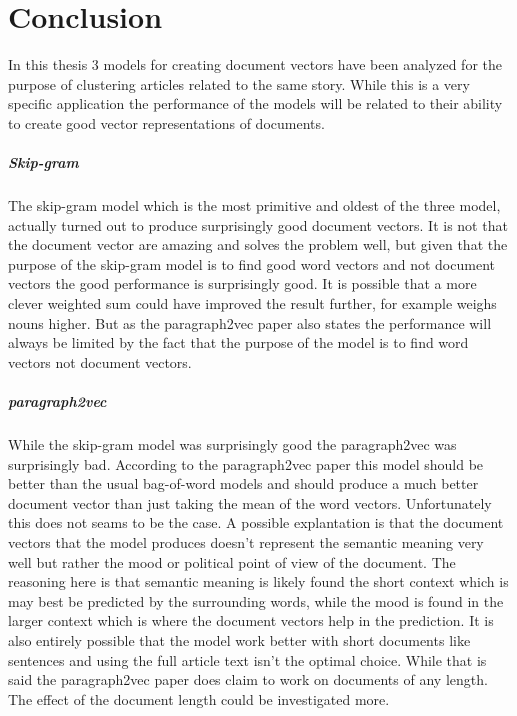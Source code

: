 \chapter{Conclusion}

In this thesis 3 models for creating document vectors have been analyzed for the purpose of clustering articles related to the same story. While this is a very specific application the performance of the models will be related to their ability to create good vector representations of documents.

\paragraph{Skip-gram} The skip-gram model which is the most primitive and oldest of the three model, actually turned out to produce surprisingly good document vectors. It is not that the document vector are amazing and solves the problem well, but given that the purpose of the skip-gram model is to find good word vectors and not document vectors the good performance is surprisingly good. It is possible that a more clever weighted sum could have improved the result further, for example weighs nouns higher. But as the paragraph2vec paper \cite{doc2vec} also states the performance will always be limited by the fact that the purpose of the model is to find word vectors not document vectors.

\paragraph{paragraph2vec} While the skip-gram model was surprisingly good the paragraph2vec was surprisingly bad. According to the paragraph2vec paper \cite{doc2vec} this model should be better than the usual bag-of-word models and should produce a much better document vector than just taking the mean of the word vectors. Unfortunately this does not seams to be the case. A possible explantation is that the document vectors that the model produces doesn't represent the semantic meaning very well but rather the mood or political point of view of the document. The reasoning here is that semantic meaning is likely found the short context which is may best be predicted by the surrounding words, while the mood is found in the larger context which is where the document vectors help in the prediction. It is also entirely possible that the model work better with short documents like sentences and using the full article text isn't the optimal choice. While that is said the paragraph2vec paper \cite{doc2vec} does claim to work on documents of any length. The effect of the document length could be investigated more.

